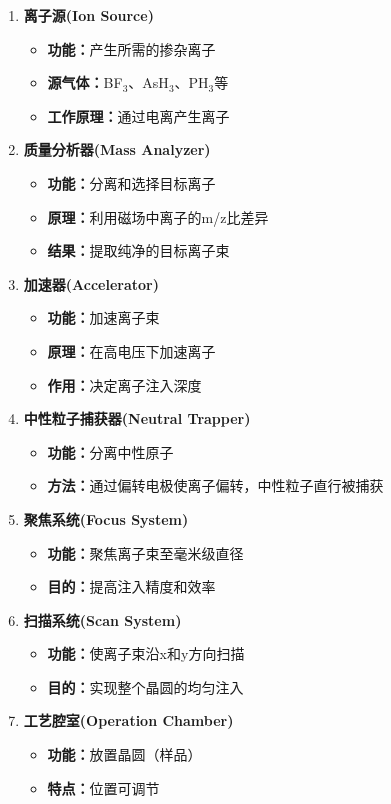 \documentclass[UTF8,12pt,a4paper]{ctexart}
\begin{document}
\begin{enumerate}
    \item \textbf{离子源(Ion Source)}
    \begin{itemize}
        \item \textbf{功能：}产生所需的掺杂离子
        \item \textbf{源气体：}BF$_3$、AsH$_3$、PH$_3$等
        \item \textbf{工作原理：}通过电离产生离子
    \end{itemize}
    
    \item \textbf{质量分析器(Mass Analyzer)}
    \begin{itemize}
        \item \textbf{功能：}分离和选择目标离子
        \item \textbf{原理：}利用磁场中离子的m/z比差异
        \item \textbf{结果：}提取纯净的目标离子束
    \end{itemize}
    
    \item \textbf{加速器(Accelerator)}
    \begin{itemize}
        \item \textbf{功能：}加速离子束
        \item \textbf{原理：}在高电压下加速离子
        \item \textbf{作用：}决定离子注入深度
    \end{itemize}
    
    \item \textbf{中性粒子捕获器(Neutral Trapper)}
    \begin{itemize}
        \item \textbf{功能：}分离中性原子
        \item \textbf{方法：}通过偏转电极使离子偏转，中性粒子直行被捕获
    \end{itemize}
    
    \item \textbf{聚焦系统(Focus System)}
    \begin{itemize}
        \item \textbf{功能：}聚焦离子束至毫米级直径
        \item \textbf{目的：}提高注入精度和效率
    \end{itemize}
    
    \item \textbf{扫描系统(Scan System)}
    \begin{itemize}
        \item \textbf{功能：}使离子束沿x和y方向扫描
        \item \textbf{目的：}实现整个晶圆的均匀注入
    \end{itemize}
    
    \item \textbf{工艺腔室(Operation Chamber)}
    \begin{itemize}
        \item \textbf{功能：}放置晶圆（样品）
        \item \textbf{特点：}位置可调节
    \end{itemize}
\end{enumerate}
\end{document}
